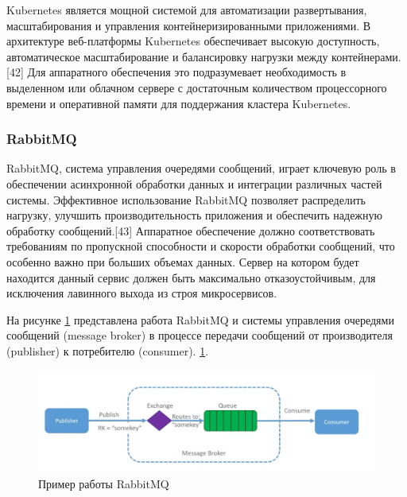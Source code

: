 Kubernetes является мощной системой для автоматизации развертывания, масштабирования и управления контейнеризированными приложениями. В архитектуре веб-платформы Kubernetes обеспечивает высокую доступность, автоматическое масштабирование и балансировку нагрузки между контейнерами.[42] Для аппаратного обеспечения это подразумевает необходимость в выделенном или облачном сервере с достаточным количеством процессорного времени и оперативной памяти для поддержания кластера Kubernetes.

\subsubsection{RabbitMQ}

RabbitMQ, система управления очередями сообщений, играет ключевую роль в обеспечении асинхронной обработки данных и интеграции различных частей системы. Эффективное использование RabbitMQ позволяет распределить нагрузку, улучшить производительность приложения и обеспечить надежную обработку сообщений.[43] Аппаратное обеспечение должно соответствовать требованиям по пропускной способности и скорости обработки сообщений, что особенно важно при больших объемах данных. Сервер на котором будет находится данный сервис должен быть максимально отказоустойчивым, для исключения лавинного выхода из строя микросервисов.

На рисунке \ref{fig:-RabbitMQ} представлена работа RabbitMQ и системы управления очередями сообщений (message broker) в процессе передачи сообщений от производителя (publisher) к потребителю (consumer). \ref{fig:-RabbitMQ}.
\begin{figure}
	\centering
	\includegraphics[width=0.9\linewidth]{"images/RabbitMQ"}
	\caption{Пример работы RabbitMQ}
	\label{fig:-RabbitMQ}
\end{figure}

